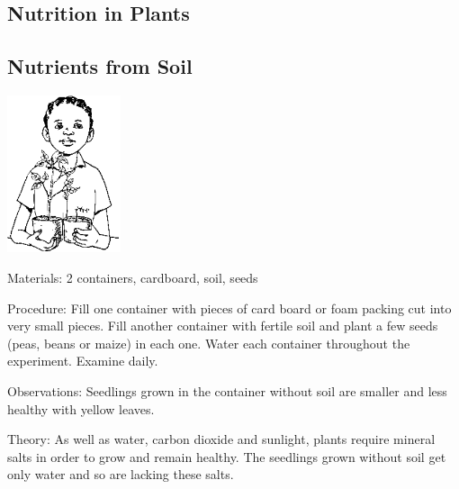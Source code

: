 \begin{multicols}{2}

\section*{Nutrition in Plants}


\subsection{Nutrients from Soil} %

\begin{center}
\includegraphics[width=0.25\textwidth]{./img/source/nutrients-plants.png}
\end{center}

\begin{description*}
\item[Materials:]{2 containers, cardboard, soil, seeds}
\item[Procedure:]{Fill one container with pieces of card board or foam packing cut
into very small pieces. Fill another container with fertile soil and plant a few seeds (peas,
beans or maize) in each one. Water each container throughout the experiment. Examine daily.}
\item[Observations:]{Seedlings grown in the container without soil are smaller and less healthy with yellow leaves.}
\item[Theory:]{As well as water, carbon dioxide and sunlight, plants require mineral salts in order to grow
and remain healthy. The seedlings grown without soil get only water and so are lacking these
salts.}
\end{description*}


\end{multicols}
